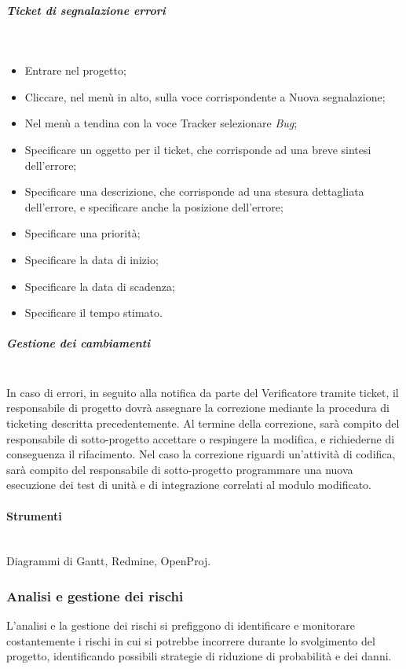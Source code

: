 \subparagraph{Ticket di segnalazione errori} \hfill \\
\label{ticket_bug}
\begin{itemize}
\item Entrare nel progetto;
\item Cliccare, nel menù in alto, sulla voce corrispondente a Nuova segnalazione;
\item Nel menù a tendina con la voce Tracker selezionare \textit{Bug};
\item Specificare un oggetto per il ticket, che corrisponde ad una breve sintesi dell'errore;
\item Specificare una descrizione, che corrisponde ad una stesura dettagliata dell'errore, e specificare anche la posizione dell'errore;
\item Specificare una priorità;
\item Specificare la data di inizio;
\item Specificare la data di scadenza;
\item Specificare il tempo stimato.
\end{itemize}

\subparagraph{Gestione dei cambiamenti} \hfill \\

In caso di errori, in seguito alla notifica da parte del Verificatore tramite ticket, il responsabile di progetto dovrà assegnare la correzione mediante la procedura di
ticketing descritta precedentemente.
Al termine della correzione, sarà compito del responsabile di sotto-progetto accettare o respingere la modifica, e richiederne di conseguenza il rifacimento.
Nel caso la correzione riguardi un’attivit\`{a} di codifica, sarà compito del responsabile di sotto-progetto programmare una nuova esecuzione dei test di unità e di integrazione correlati al modulo modificato.



\paragraph{Strumenti} \hfill \\
Diagrammi di Gantt, Redmine, OpenProj.


\subsubsection{Analisi e gestione dei rischi}

L'analisi e la gestione dei rischi si prefiggono di identificare e  monitorare costantemente i rischi in cui si potrebbe incorrere durante lo svolgimento del progetto, identificando possibili strategie di riduzione di probabilità e dei danni. 


